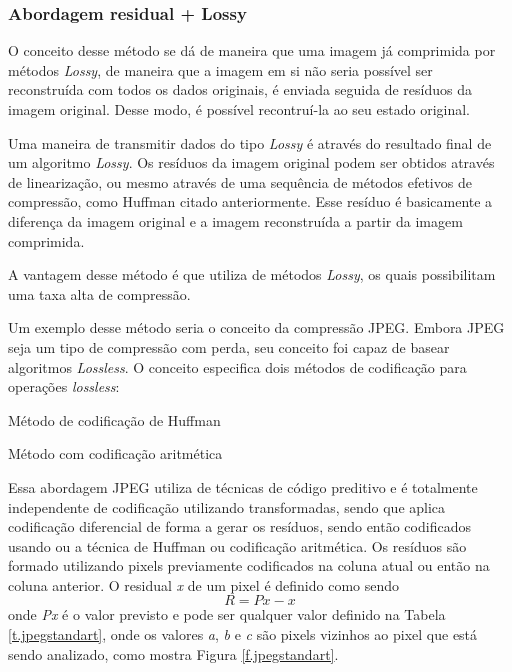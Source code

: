 \subsubsection{Abordagem residual + Lossy}
\label{sss.lossyresidual}

O conceito desse método se dá de maneira que uma imagem já comprimida por métodos {\em Lossy}, de maneira que a imagem em si não seria possível ser reconstruída com todos os dados originais, é enviada seguida de resíduos da imagem original. Desse modo, é possível recontruí-la ao seu estado original.

Uma maneira de transmitir dados do tipo {\em Lossy} é através do resultado final de um algoritmo {\em Lossy}. Os resíduos da imagem original podem ser obtidos através de linearização, ou mesmo através de uma sequência de métodos efetivos de compressão, como Huffman citado anteriormente. Esse resíduo é basicamente a diferença da imagem original e a imagem reconstruída a partir da imagem comprimida.

A vantagem desse método é que utiliza de métodos {\em Lossy}, os quais possibilitam uma taxa alta de compressão.

Um exemplo desse método seria o conceito da compressão JPEG. Embora JPEG seja um tipo de compressão com perda, seu conceito foi capaz de basear algoritmos {\em Lossless}. O conceito especifica dois métodos de codificação para operações {\em lossless}:

\begin{alineas}
    \item Método de codificação de Huffman
    \item Método com codificação aritmética
\end{alineas}

Essa abordagem JPEG utiliza de técnicas de código preditivo e é totalmente independente de codificação utilizando transformadas, sendo que aplica codificação diferencial de forma a gerar os resíduos, sendo então codificados usando ou a técnica de Huffman ou codificação aritmética. Os resíduos são formado utilizando pixels previamente codificados na coluna atual ou então na coluna anterior. O residual {\em x} de um pixel é definido como sendo \[ R = Px - x \] onde {\em Px} é o valor previsto e pode ser qualquer valor definido na Tabela \ref{t.jpegstandart}, onde os valores {\em a}, {\em b} e {\em c} são pixels vizinhos ao pixel que está sendo analizado, como mostra Figura \ref{f.jpegstandart}.

